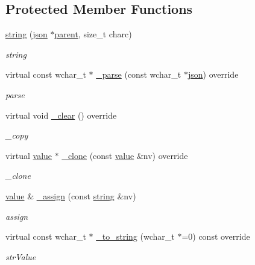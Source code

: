 \subsection*{Protected Member Functions}
\begin{DoxyCompactItemize}
\item 
\hyperlink{classformat_1_1string_a264d5b290279be616e7f48c54a295635}{string} (\hyperlink{classformat_1_1json}{json} $\ast$\hyperlink{classformat_1_1value_a86c03ec8810bfd0d60ec49095120040d}{parent}, size\+\_\+t charc)
\begin{DoxyCompactList}\small\item\em string \end{DoxyCompactList}\item 
virtual const wchar\+\_\+t $\ast$ \hyperlink{classformat_1_1string_a1a3b05c60c4cc387d4a37956f20a56f3}{\+\_\+parse} (const wchar\+\_\+t $\ast$\hyperlink{classformat_1_1json}{json}) override
\begin{DoxyCompactList}\small\item\em parse \end{DoxyCompactList}\item 
virtual void \hyperlink{classformat_1_1string_a3217635d20a78516525fd6adb59576fb}{\+\_\+clear} () override
\begin{DoxyCompactList}\small\item\em \+\_\+copy \end{DoxyCompactList}\item 
virtual \hyperlink{classformat_1_1value_aa6b85823936bf7b8ab78d3f8d443c00d}{value} $\ast$ \hyperlink{classformat_1_1string_a876061b10e5edf4d8ba9801bf819f8c9}{\+\_\+clone} (const \hyperlink{classformat_1_1value_aa6b85823936bf7b8ab78d3f8d443c00d}{value} \&nv) override
\begin{DoxyCompactList}\small\item\em \+\_\+clone \end{DoxyCompactList}\item 
\hyperlink{classformat_1_1value_aa6b85823936bf7b8ab78d3f8d443c00d}{value} \& \hyperlink{classformat_1_1string_adafebf74fd93cb4929a9cee1f13765c3}{\+\_\+assign} (const \hyperlink{classformat_1_1string}{string} \&nv)
\begin{DoxyCompactList}\small\item\em assign \end{DoxyCompactList}\item 
virtual const wchar\+\_\+t $\ast$ \hyperlink{classformat_1_1string_a4522fce4f8002088bccdcb7b2aba53b6}{\+\_\+to\+\_\+string} (wchar\+\_\+t $\ast$=0) const override
\begin{DoxyCompactList}\small\item\em str\+Value \end{DoxyCompactList}\end{DoxyCompactItemize}
